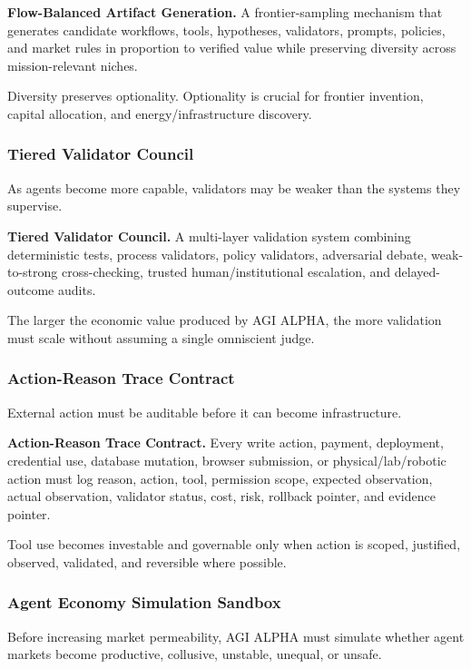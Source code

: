 \documentclass[
  11pt,
]{article}
\begin{document}
\textbf{Flow-Balanced Artifact Generation.} A frontier-sampling
mechanism that generates candidate workflows, tools, hypotheses,
validators, prompts, policies, and market rules in proportion to
verified value while preserving diversity across mission-relevant
niches.

Diversity preserves optionality. Optionality is crucial for frontier
invention, capital allocation, and energy/infrastructure discovery.

\subsubsection{Tiered Validator Council}\label{tiered-validator-council}

As agents become more capable, validators may be weaker than the systems
they supervise.

\textbf{Tiered Validator Council.} A multi-layer validation system
combining deterministic tests, process validators, policy validators,
adversarial debate, weak-to-strong cross-checking, trusted
human/institutional escalation, and delayed-outcome audits.

The larger the economic value produced by AGI ALPHA, the more validation
must scale without assuming a single omniscient judge.

\subsubsection{Action-Reason Trace
Contract}\label{action-reason-trace-contract}

External action must be auditable before it can become infrastructure.

\textbf{Action-Reason Trace Contract.} Every write action, payment,
deployment, credential use, database mutation, browser submission, or
physical/lab/robotic action must log reason, action, tool, permission
scope, expected observation, actual observation, validator status, cost,
risk, rollback pointer, and evidence pointer.

Tool use becomes investable and governable only when action is scoped,
justified, observed, validated, and reversible where possible.

\subsubsection{Agent Economy Simulation
Sandbox}\label{agent-economy-simulation-sandbox}

Before increasing market permeability, AGI ALPHA must simulate whether
agent markets become productive, collusive, unstable, unequal, or
unsafe.
\end{document}
